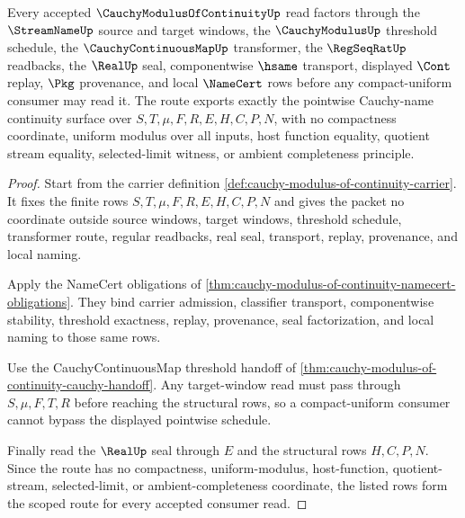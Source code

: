 \begin{theorem}
\label{thm:cauchy-modulus-of-continuity-scoped-route}
Every accepted $\CauchyModulusOfContinuityUp$ read factors through the $\StreamNameUp$ source and target windows, the $\CauchyModulusUp$ threshold schedule, the $\CauchyContinuousMapUp$ transformer, the $\RegSeqRatUp$ readbacks, the $\RealUp$ seal, componentwise $\hsame$ transport, displayed $\Cont$ replay, $\Pkg$ provenance, and local $\NameCert$ rows before any compact-uniform consumer may read it. The route exports exactly the pointwise Cauchy-name continuity surface over $S,T,\mu,F,R,E,H,C,P,N$, with no compactness coordinate, uniform modulus over all inputs, host function equality, quotient stream equality, selected-limit witness, or ambient completeness principle.
\end{theorem}
\begin{proof}
Start from the carrier definition \autoref{def:cauchy-modulus-of-continuity-carrier}. It fixes the finite rows $S,T,\mu,F,R,E,H,C,P,N$ and gives the packet no coordinate outside source windows, target windows, threshold schedule, transformer route, regular readbacks, real seal, transport, replay, provenance, and local naming.

Apply the NameCert obligations of \autoref{thm:cauchy-modulus-of-continuity-namecert-obligations}. They bind carrier admission, classifier transport, componentwise stability, threshold exactness, replay, provenance, seal factorization, and local naming to those same rows.

Use the CauchyContinuousMap threshold handoff of \autoref{thm:cauchy-modulus-of-continuity-cauchy-handoff}. Any target-window read must pass through $S,\mu,F,T,R$ before reaching the structural rows, so a compact-uniform consumer cannot bypass the displayed pointwise schedule.

Finally read the $\RealUp$ seal through $E$ and the structural rows $H,C,P,N$. Since the route has no compactness, uniform-modulus, host-function, quotient-stream, selected-limit, or ambient-completeness coordinate, the listed rows form the scoped route for every accepted consumer read.
\end{proof}

